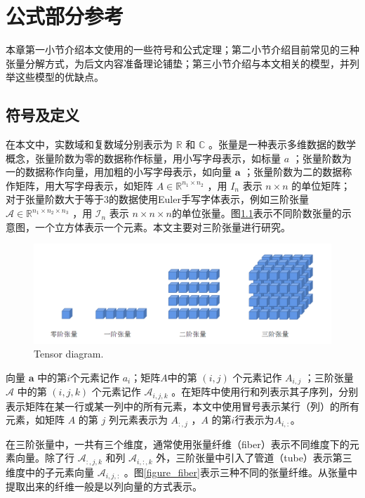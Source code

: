
\chapter{公式部分参考}\label{chapter2}
\vbox{}\vbox{}

本章第一小节介绍本文使用的一些符号和公式定理；第二小节介绍目前常见的三种张量分解方式，为后文内容准备理论铺垫；第三小节介绍与本文相关的模型，并列举这些模型的优缺点。

\vbox{}
\section{符号及定义}
\vbox{}

在本文中，实数域和复数域分别表示为 $ \mathbb{R} $ 和 $ \mathbb{C} $ 。张量是一种表示多维数据的数学概念，张量阶数为零的数据称作标量，用小写字母表示，如标量 $ a $ ；张量阶数为一的数据称作向量，用加粗的小写字母表示，如向量 $ \mathbf{a}$ ；张量阶数为二的数据称作矩阵，用大写字母表示，如矩阵 $A\in \mathbb{R}^{n_1\times n_2} $ ，用 $ I_n $ 表示 $ n \times n $ 的单位矩阵；对于张量阶数大于等于$ 3 $的数据使用Euler手写字体表示，例如三阶张量 $\mathcal{A} \in \mathbb{R}^{n_1\times n_2\times n_3}$ ，用 $ \mathcal{I}_n $ 表示 $ n \times n \times n $的单位张量。图\ref{figure_tensor}表示不同阶数张量的示意图，一个立方体表示一个元素。本文主要对三阶张量进行研究。


\begin{figure}[htbp]
	\centering
	\includegraphics[scale=0.5]{pic/chap2/1.png}
	{Tensor diagram.}
	\label{figure_tensor}
\end{figure}

向量 $ \mathbf{a} $ 中的第$ i $个元素记作 $ a_i $；矩阵$ A $中的第 $ (i,j) $ 个元素记作 $ A_{i,j} $ ；三阶张量 $ \mathcal{A} $ 中的第 $ (i,j,k) $ 个元素记作 $ \mathcal{A}_{i,j,k} $ 。在矩阵中使用行和列表示其子序列，分别表示矩阵在某一行或某一列中的所有元素，本文中使用冒号表示某行（列）的所有元素，如矩阵 $ A $ 的第 $ j $ 列元素表示为 $ A_{:,j} $ ，$ A $ 的第$ i $行表示为$ A_{i,:} $。

在三阶张量中，一共有三个维度，通常使用张量纤维（fiber）表示不同维度下的元素向量。除了行 $ \mathcal{A}_{:,j,k} $ 和列 $ \mathcal{A}_{i,:,k} $ 外，三阶张量中引入了管道（tube）表示第三维度中的子元素向量 $ \mathcal{A}_{i,j,:} $ 。图\ref{figure_fiber}表示三种不同的张量纤维。从张量中提取出来的纤维一般是以列向量的方式表示。

